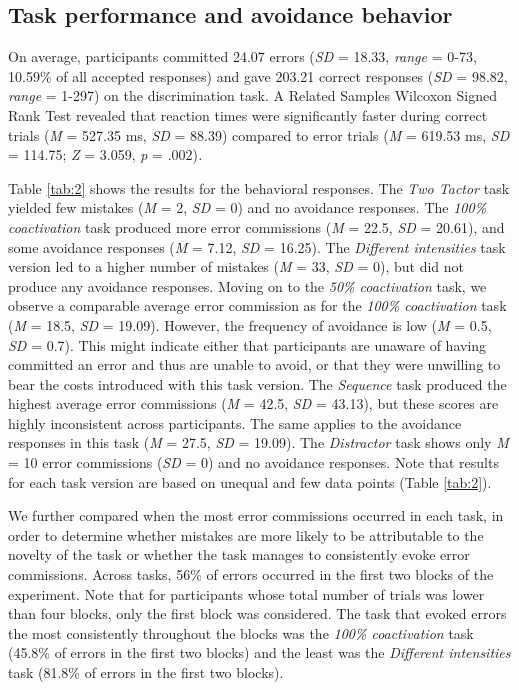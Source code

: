 \documentclass[twocolumn, serif, authordate, empirical]{jote-article}
\begin{document}
 {}\subsection*{Task performance and avoidance behavior} 

On average, participants committed 24.07 errors (\emph{SD} = 18.33, \emph{range} = 0-73, 10.59\% of all accepted responses) and gave 203.21 correct responses (\emph{SD} = 98.82, \emph{range} = 1-297) on the discrimination task. A Related Samples Wilcoxon Signed Rank Test revealed that reaction times were significantly faster during correct trials (\emph{M} = 527.35 ms, \emph{SD} = 88.39) compared to error trials (\emph{M} = 619.53 ms, \emph{SD} = 114.75; \emph{Z} = 3.059, \emph{p} = .002)\emph{.}

Table \ref{tab:2} shows the results for the behavioral responses. The \emph{Two Tactor} task yielded few mistakes (\emph{M} = 2, \emph{SD} = 0) and no avoidance responses. The \emph{100\% coactivation} task produced more error commissions (\emph{M} = 22.5, \emph{SD} = 20.61), and some avoidance responses (\emph{M} = 7.12, \emph{SD} = 16.25). The \emph{Different intensities} task version led to a higher number of mistakes (\emph{M} = 33, \emph{SD} = 0), but did not produce any avoidance responses. Moving on to the \emph{50\% coactivation} task, we observe a comparable average error commission as for the \emph{100\%
coactivation} task (\emph{M} = 18.5, \emph{SD} = 19.09). However, the frequency of avoidance is low (\emph{M} = 0.5, \emph{SD} = 0.7). This might indicate either that participants are unaware of having committed an error and thus are unable to avoid, or that they were unwilling to bear the costs introduced with this task version. The \emph{Sequence}
task produced the highest average error commissions (\emph{M} = 42.5, \emph{SD} = 43.13), but these scores are highly inconsistent across participants. The same applies to the avoidance responses in this task (\emph{M} = 27.5, \emph{SD} = 19.09). The \emph{Distractor} task shows only \emph{M} = 10 error commissions (\emph{SD} = 0) and no avoidance responses. Note that results for each task version are based on unequal and few data points (Table \ref{tab:2}).~

We further compared when the most error commissions occurred in each task, in order to determine whether mistakes are more likely to be attributable to the novelty of the task or whether the task manages to consistently evoke error commissions. Across tasks, 56\% of errors occurred in the first two blocks of the experiment. Note that for participants whose total number of trials was lower than four blocks, only the first block was considered. The task that evoked errors the most consistently throughout the blocks was the \emph{100\% coactivation} task (45.8\% of errors in the first two blocks) and the least was the \emph{Different intensities} task (81.8\% of errors in the first two blocks).~
\end{document}

